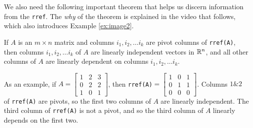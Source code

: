 \documentclass{ximera}
\begin{document}
We also need the following important theorem that helps us discern information from the \texttt{rref}. The \emph{why} of the theorem is explained in the video that follows, which also introduces Example \ref{ex:image2}.

\begin{theorem}
  If $A$ is an $m\times n$ matrix and columns $i_1, i_2, \ldots i_k$ are pivot columns of \texttt{rref(A)}, then columns $i_1, i_2, \ldots i_k$ of $A$ are linearly independent vectors in $\mathbb{R}^n$, and all other columns of $A$ are linearly dependent on columns $i_1, i_2, \ldots i_k$.

  As an example, if $A=\begin{bmatrix}
    1 & 2 & 3\\
    0 & 2 & 2 \\
    1 & 0 & 1
  \end{bmatrix}$, then \texttt{rref(A)}$=\begin{bmatrix}
    1 & 0 & 1\\0&1&1\\0&0&0
  \end{bmatrix}$. Columns $1\&2$ of \texttt{rref(A)} are pivots, so the first two columns of $A$ are linearly independent. The third column of \texttt{rref(A)} is not a pivot, and so the third column of $A$ linearly depends on the first two. 
\end{theorem}

\begin{center}
\end{center}
 
\end{document}
